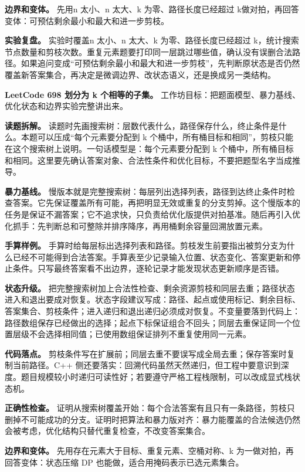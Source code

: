 \textbf{边界和变体。} 先用n 太小、n 太大、k 为零、路径长度已经超过 k做对拍，再回答变体：可预估剩余最小和最大和进一步剪枝。

\textbf{实验复盘。} 实验时覆盖n 太小、n 太大、k 为零、路径长度已经超过 k，统计搜索节点数量和剪枝次数。重复元素题要打印同一层跳过哪些值，确认没有误删合法路径。如果追问变成“可预估剩余最小和最大和进一步剪枝”，先判断原状态是否仍然覆盖新答案集合，再决定是微调边界、改状态语义，还是换成另一类结构。

\noindent\textbf{LeetCode 698 划分为 k 个相等的子集。} 工作坊目标：把题面模型、暴力基线、优化状态和边界实验完整讲出来。

\textbf{读题拆解。} 读题时先画搜索树：层数代表什么，路径保存什么，终止条件是什么。本题可以压成“每个元素要分配到 k 个桶中，所有桶目标和相同”，剪枝只能在这个搜索树上说明。一句话模型是：每个元素要分配到 k 个桶中，所有桶目标和相同。这里要先确认答案对象、合法性条件和优化目标，不要把题型名字当成推导。

\textbf{暴力基线。} 慢版本就是完整搜索树：每层列出选择列表，路径到达终止条件时检查答案。它先保证覆盖所有可能，再把明显无效或重复的分支剪掉。这个慢版本的任务是保证不漏答案；它不追求快，只负责给优化版提供对拍基准。随后再引入优化抓手：先判断总和可整除并排序降序，再用桶剩余容量回溯放置元素。

\textbf{手算样例。} 手算时给每层标出选择列表和路径。剪枝发生前要指出被剪分支为什么已经不可能得到合法答案。手算表至少记录输入位置、状态变化、答案更新和停止条件。只写最终答案看不出边界，逐轮记录才能发现状态更新顺序是否错。

\textbf{状态升级。} 把完整搜索树加上合法性检查、剩余资源剪枝和同层去重；路径状态进入和退出要成对恢复。状态字段建议写成：路径、起点或使用标记、剩余目标、答案集合、剪枝条件；进入递归和退出递归必须成对恢复。不变量要落到代码上：路径数组保存已经做出的选择；起点下标保证组合不回头；同层去重保证同一个位置层级不会选择相同值；已使用数组保证排列不重复使用同一元素。

\textbf{代码落点。} 剪枝条件写在扩展前；同层去重不要误写成全局去重；保存答案时复制当前路径。C++ 侧还要落实：回溯代码虽然天然递归，但工程中要意识到深度。题目规模较小时递归可读性好；若要遵守严格工程栈限制，可以改成显式栈状态机。

\textbf{正确性检查。} 证明从搜索树覆盖开始：每个合法答案有且只有一条路径，剪枝只删掉不可能成功的分支。证明时把算法和暴力版对齐：暴力能覆盖的合法候选仍然会被考虑，优化结构只替代重复检查，不改变答案集合。

\textbf{边界和变体。} 先用存在元素大于目标、重复元素、空桶对称、k 为一做对拍，再回答变体：状态压缩 DP 也能做，适合用掩码表示已选元素集合。

